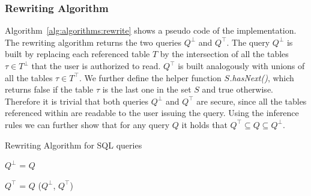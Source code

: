 \subsubsection{Rewriting Algorithm}
%
Algorithm~\ref{alg:algorithms:rewrite} shows a pseudo code of the implementation.
%
The rewriting algorithm returns the two queries $Q^\bot$ and $Q^\top$.
%
The query $Q^\bot$ is built by replacing each referenced table $T$ by the intersection of all the tables $\tau \in T^\bot$ that the user is authorized to read.
%
$Q^\top$ is built analogously with unions of all the tables $\tau \in T^\top$.
%
We further define the helper function \emph{$S$.hasNext()}, which returns false if the table $\tau$ is the last one in the set $S$ and true otherwise.
%
Therefore it is trivial that both queries $Q^\bot$ and $Q^\top$ are secure, since all the tables referenced within are readable to the user issuing the query.
%
Using the inference rules we can further show that for any query $Q$ it holds that $Q^\top \subseteq Q \subseteq Q^\bot$.
%
\begin{algorithm}
\caption{Rewriting Algorithm for SQL queries}
\label{alg:algorithms:rewrite}
	\SetAlgoLined
	$Q^\bot$ = $Q$\;
    
    $Q^\top$ = $Q$\;
     \Return ($Q^\bot$, $Q^\top$)\;
\end{algorithm}

